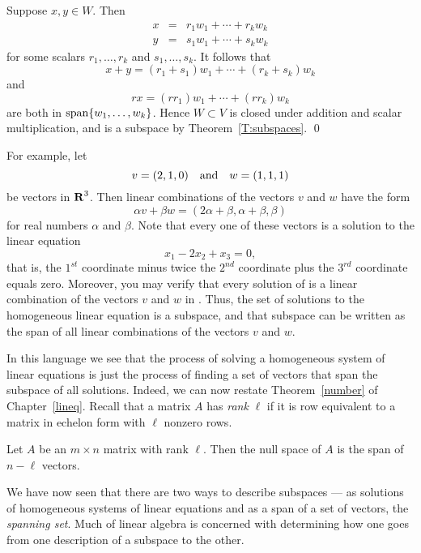 \proof  Suppose $x,y\in W$.  Then
\begin{eqnarray*}
x & = & r_1w_1 + \cdots + r_kw_k \\
y & = & s_1w_1 + \cdots + s_kw_k
\end{eqnarray*}
for some scalars $r_1,\ldots,r_k$ and $s_1,\ldots,s_k$.  It
follows that
\[
x+y = (r_1+s_1)w_1 + \cdots + (r_k+s_k)w_k
\]
and
\[
rx = (rr_1)w_1 + \cdots + (rr_k)w_k
\]
are both in ${\rm span}\{w_1,\ldots,w_k\}$. Hence $W\subset V$ is
closed under addition and scalar multiplication, and is a
subspace by Theorem~\ref{T:subspaces}. \qed

For example, let
\begin{equation}  \label{e:vandw}
v=(2,1,0) \quad\mbox{and}\quad w=(1,1,1)
\end{equation}
be vectors in $\mbox{$\bf{R}$}^3$. Then linear combinations of the vectors
$v$ and $w$ have the form
\[
\alpha v + \beta w = (2\alpha+\beta, \alpha+\beta, \beta)
\]
for real numbers $\alpha$ and $\beta$.  Note that every one of
these vectors is a solution to the linear equation
\begin{equation} \label{ex1}
x_1 - 2x_2 + x_3 = 0,
\end{equation}
that is, the $1^{st}$ coordinate minus twice the $2^{nd}$ coordinate 
plus the $3^{rd}$ coordinate equals zero.  Moreover, you may verify 
that every solution of  is a linear combination
of the vectors $v$ and $w$ in .  Thus, the set of
solutions to the homogeneous linear equation
 is a
subspace, and that subspace can be written as the span of
all linear combinations of the vectors $v$ and $w$.

In this language we see that the process of solving a
homogeneous system of linear equations is just the process of
finding a set of vectors that span the subspace of all
solutions.  Indeed,
we can now restate Theorem~\ref{number} of Chapter~\ref{lineq}.
Recall that a matrix $A$ has {\em rank\/} $\ell$ if it is row
equivalent to a matrix in echelon form with $\ell$ nonzero rows.

\begin{prop}  \label{P:n-rank}
Let $A$ be an $m\times n$ matrix with rank $\ell$. Then the
null space of $A$ is the span of $n-\ell$ vectors.
\end{prop}  

We have now seen that there are two ways to describe subspaces ---
as solutions of homogeneous systems of linear equations and as a
span of a set of vectors, the {\em spanning set}.
Much of linear algebra is concerned
with determining how one goes from one description of a subspace
to the other.


